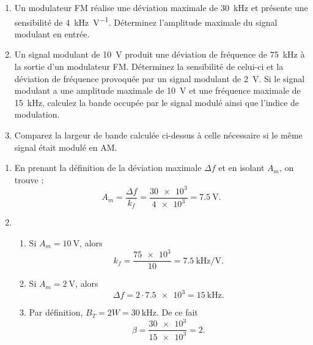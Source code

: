 \documentclass [a4paper, 11pt] {article}
\begin{document}
    \begin{exercice}[Modulation FM]{2}
    
        \begin{enumerate}
            \item Un modulateur FM réalise une déviation maximale de \SI{30}{\kilo\hertz} et présente une sensibilité de \SI{4}{\kilo\hertz\per\volt}. Déterminez l'amplitude maximale du signal modulant en entrée.
            \item Un signal modulant de \SI{10}{\volt} produit une déviation de fréquence de \SI{75}{\kilo\hertz} à la sortie d'un modulateur FM. Déterminez la sensibilité de celui-ci et la déviation de fréquence provoquée par un signal modulant de \SI{2}{\volt}. Si le signal modulant a une amplitude maximale de \SI{10}{\volt} et une fréquence maximale de \SI{15}{\kilo\hertz}, calculez la bande occupée par le signal modulé ainsi que l'indice de modulation.
            \item Comparez la largeur de bande calculée ci-dessus à celle nécessaire si le même signal était modulé en AM.
        \end{enumerate}
        
    \end{exercice}
    
    \begin{reponse}
        \begin{enumerate}
            \item En prenant la définition de la déviation maximale $\Delta f$ et en isolant $A_m$, on trouve :
            \begin{equation}
                A_m = \frac{\Delta f}{k_f} = \frac{\num{30e3}}{\num{4e3}} = \SI{7.5}{\volt}.
            \end{equation}
        \item \begin{enumerate}
                \item Si $A_m=\SI{10}{\volt}$, alors
                \begin{equation}
                    k_f = \frac{\num{75e3}}{10} = \SI{7.5}{\kilo\hertz\per\volt}.
                \end{equation}
                \item Si $A_m=\SI{2}{\volt}$, alors
                \begin{equation}
                    \Delta f = 2 \cdot \num{7.5e3} = \SI{15}{\kilo\hertz}.
                \end{equation}
                \item Par définition, $B_T = 2 W=\SI{30}{\kilo\hertz}$. De ce fait
                \begin{equation}
                    \beta = \frac{\num{30e3}}{\num{15e3}}=2.
                \end{equation}
            \end{enumerate}
        \end{enumerate}
    \end{reponse}
    
\end{document}
